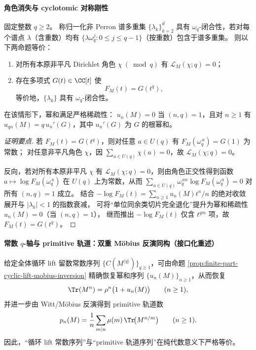 \paragraph{角色消失与 cyclotomic 对称刚性}
\begin{theorem}\label{thm:finite-part-dirichlet-vanishing-cyclotomic-symmetry}
固定整数 \(q\ge2\)。
称归一化非 Perron 谱多重集 \(\{\lambda_k\}_{k=2}^d\) 具有 \(\omega_q\)-闭合性，若对每个谱点 \(\lambda\)（含重数）均有
\(\{\lambda\omega_q^j:0\le j\le q-1\}\)（按重数）包含于谱多重集。
则以下两命题等价：
\begin{enumerate}
  \item 对所有本原非平凡 Dirichlet 角色 \(\chi\ (\bmod q)\) 有 \(\mathcal{L}_M(\chi;q)=0\)；
  \item 存在多项式 \(G(t)\in\CC[t]\) 使
  \[
  F_M(t)=G(t^q),
  \]
  等价地，\(\{\lambda_k\}\) 具有 \(\omega_q\)-闭合性。
\end{enumerate}
在该情形下，幂和满足严格稀疏性：
\(u_n(M)=0\) 当 \((n,q)=1\)，且对 \(n\ge1\) 有 \(u_{qn}(M)=q\,u_n'(G)\)，其中 \(u_n'(G)\) 为 \(G\) 的根幂和。
\end{theorem}
\begin{proof}[证明要点]
若 \(F_M(t)=G(t^q)\)，则对任意 \(a\in U(q)\) 有 \(F_M(\omega_q^{\,a})=G(1)\) 为常数；
对任意非平凡角色 \(\chi\)，因 \(\sum_{a\in U(q)}\chi(a)=0\)，故 \(\mathcal{L}_M(\chi;q)=0\)。
\par
反向，若对所有本原非平凡 \(\chi\) 有 \(\mathcal{L}_M(\chi;q)=0\)，则由角色正交性得到函数
\(a\mapsto \log F_M(\omega_q^{\,a})\) 在 \(U(q)\) 上为常数，从而
\(\sum_{a\in U(q)}\omega_q^{\,an}\log F_M(\omega_q^{\,a})=0\) 对所有 \((n,q)=1\) 成立。
结合
\(
-\log F_M(t)=\sum_{n\ge1}u_n(M)t^n/n
\)
的绝对收敛展开与 \(|\lambda_k|<1\) 的指数衰减，
可将“单位同余类切片完全退化”提升为幂和稀疏性 \(u_n(M)=0\)（当 \((n,q)=1\)），
继而推出 \(-\log F_M(t)\) 仅含 \(t^{qm}\) 项，故 \(F_M(t)=G(t^q)\)。
\end{proof}

\paragraph{常数 \(q\)-轴与 primitive 轨道：双重 Möbius 反演同构（接口化重述）}
\begin{corollary}\label{cor:finite-part-cyclic-constant-determines-prime-orbits}
给定全体循环 lift 留数常数序列 \(\{C(M^{\langle q\rangle})\}_{q\ge1}\)，可由命题 \ref{prop:finite-part-cyclic-lift-mobius-inversion} 精确恢复幂和序列 \(\{u_n(M)\}_{n\ge1}\)，从而恢复
\[
\Tr(M^n)=\rho^n\bigl(1+u_n(M)\bigr)\qquad(n\ge1),
\]
并进一步由 Witt/Möbius 反演得到 primitive 轨道数
\[
p_n(M)=\frac{1}{n}\sum_{m\mid n}\mu(m)\,\Tr\!\bigl(M^{n/m}\bigr)\qquad(n\ge1).
\]
因此，“循环 lift 常数序列”与“primitive 轨道序列”在纯代数意义下严格等价。
\end{corollary}

